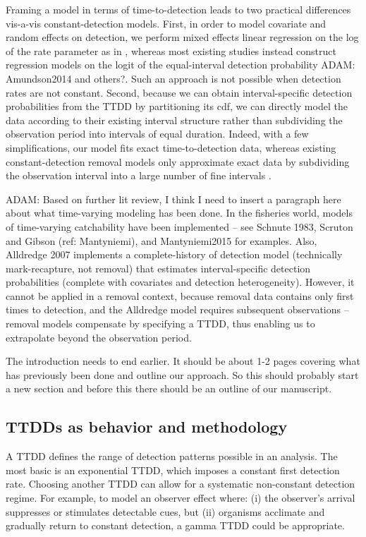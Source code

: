 \documentclass[useAMS,usenatbib,referee,12pt]{article}
\newcommand{\adam}[1]{{\color{blue} ADAM: #1}}
\newcommand{\jarad}[1]{{\color{Orange} #1}}
\begin{document}
Framing a model in terms of time-to-detection leads to two practical differences vis-a-vis constant-detection models.  
First, in order to model covariate and random effects on detection, we perform mixed effects linear regression on the log of the rate parameter as in \citet{Solymos2013}, whereas most existing studies instead construct regression models on the logit of the equal-interval detection probability \adam{Amundson2014 and others?}.  
Such an approach is not possible when detection rates are not constant.  
Second, because we can obtain interval-specific detection probabilities from the TTDD by partitioning its cdf, we can directly model the data according to their existing interval structure rather than subdividing the observation period into intervals of equal duration.  
Indeed, with a few simplifications, our model fits exact time-to-detection data, whereas existing constant-detection removal models only approximate exact data by subdividing the observation interval into a large number of fine intervals \citep{Reidy2011, Amundson2014}.

\adam{Based on further lit review, I think I need to insert a paragraph here about what time-varying modeling has been done.  
In the fisheries world, models of time-varying catchability have been implemented -- see Schnute 1983, Scruton and Gibson (ref: Mantyniemi), and Mantyniemi2015 for examples.  
Also, Alldredge 2007 implements a complete-history of detection model (technically mark-recapture, not removal) that estimates interval-specific detection probabilities (complete with covariates and detection heterogeneity).  
However, it cannot be applied in a removal context, because removal data contains only first times to detection, and the Alldredge model requires subsequent observations -- removal models compensate by specifying a TTDD, thus enabling us to extrapolate beyond the observation period.}  

\jarad{The introduction needs to end earlier. It should be about 1-2 pages covering what has previously been done and outline our approach. So this should probably start a new section and before this there should be an outline of our manuscript. }

\subsection{TTDDs as behavior and methodology}

A TTDD defines the range of detection patterns possible in an analysis.  
The most basic is an exponential TTDD, which imposes a constant first detection rate.  
Choosing another TTDD can allow for a systematic non-constant detection regime.  
For example, to model an observer effect where: (i) the observer's arrival suppresses or stimulates detectable cues, but (ii) organisms acclimate and gradually return to constant detection, a gamma TTDD could be appropriate.
\end{document}
